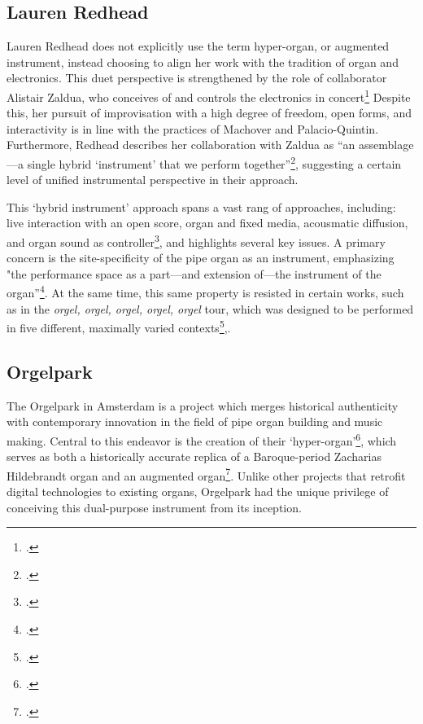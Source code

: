 \documentclass[12pt,twoside,maitrise]{dms_ks}
\theoremstyle{definition}
\begin{document}
{\subsection{Lauren Redhead}

Lauren Redhead does not explicitly use the term hyper-organ, or augmented instrument, instead choosing to align her work with the tradition of organ and electronics. This duet perspective is strengthened by the role of collaborator Alistair Zaldua, who conceives of and controls the electronics in concert\footcite[325]{redhead_organ_2016}
Despite this, her pursuit of improvisation with a high degree of freedom, open forms, and interactivity is in line with the practices of Machover and Palacio-Quintin.
Furthermore, Redhead describes her collaboration with Zaldua as “an assemblage---a single hybrid `instrument' that we perform together”\footcite[342]{redhead_developing_2023}, suggesting a certain level of unified instrumental perspective in their approach.

This `hybrid instrument' approach spans a vast rang of approaches, including: live interaction with an open score, organ and fixed media, acousmatic diffusion, and organ sound as controller\footcite[345]{redhead_developing_2023}, and highlights several key issues.
A primary concern is the site-specificity of the pipe organ as an instrument, emphasizing "the performance space as a part---and extension of---the instrument of the organ”\footcite[3]{redhead_sound_2014}.
At the same time, this same property is resisted in certain works, such as in the \textit{orgel, orgel, orgel, orgel, orgel} tour, which was designed to be performed in five different, maximally varied contexts\footcite[344--345]{redhead_developing_2023},. 

\subsection{Orgelpark}

The Orgelpark in Amsterdam is a project which merges historical authenticity with contemporary innovation in the field of pipe organ building and music making. 
Central to this endeavor is the creation of their `hyper-organ'\footcite{vrije_geluiden_superabundance_2020}, which serves as both a historically accurate replica of a Baroque-period Zacharias Hildebrandt organ and an augmented organ\footcite[36]{peters_how_2020}. 
Unlike other projects that retrofit digital technologies to existing organs, Orgelpark had the unique privilege of conceiving this dual-purpose instrument from its inception. 

}
\end{document}
